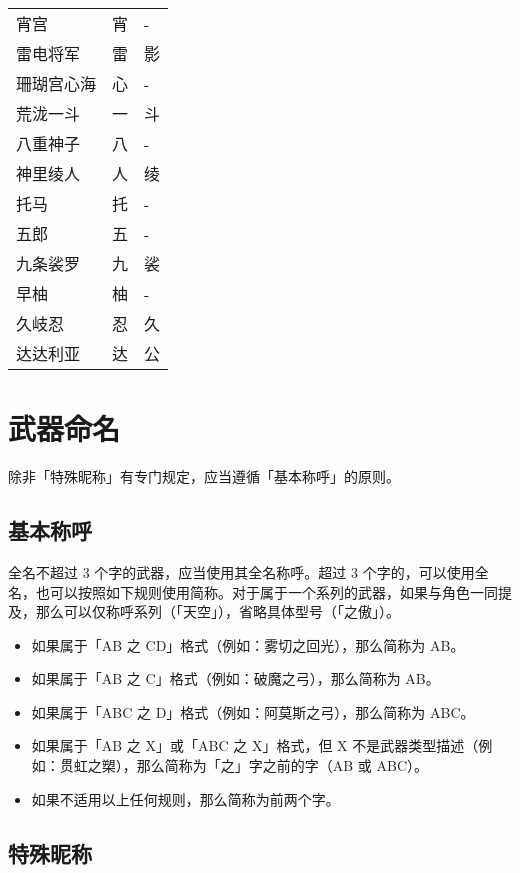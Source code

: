 \begin{longtabu}{|X[2c]|X[c]|X[c]|}
	{宵宫} & {宵} & {-} \\
	{雷电将军} & {雷} & {影} \\
	{珊瑚宫心海} & {心} & {-} \\
	{荒泷一斗} & {一} & {斗} \\
	{八重神子} & {八} & {-} \\
	{神里绫人} & {人} & {绫} \\
	\hline
	{托马} & {托} & {-} \\
	{五郎} & {五} & {-} \\
	{九条裟罗} & {九} & {裟} \\
	{早柚} & {柚} & {-} \\
	{久岐忍} & {忍} & {久} \\
	\hline
	{达达利亚} & {达} & {公} \\
\end{longtabu}




\section{武器命名}

除非「特殊昵称」有专门规定，应当遵循「基本称呼」的原则。

\subsection{基本称呼}

全名不超过 3 个字的武器，应当使用其全名称呼。超过 3 个字的，可以使用全名，也可以按照如下规则使用简称。对于属于一个系列的武器，如果与角色一同提及，那么可以仅称呼系列（「天空」），省略具体型号（「之傲」）。

\begin{itemize}
	\item 如果属于「AB 之 CD」格式（例如：雾切之回光），那么简称为 AB。
	\item 如果属于「AB 之 C」格式（例如：破魔之弓），那么简称为 AB。
	\item 如果属于「ABC 之 D」格式（例如：阿莫斯之弓），那么简称为 ABC。
	\item 如果属于「AB 之 X」或「ABC 之 X」格式，但 X 不是武器类型描述（例如：贯虹之槊），那么简称为「之」字之前的字（AB 或 ABC）。
	\item 如果不适用以上任何规则，那么简称为前两个字。
\end{itemize}

\subsection{特殊昵称}

